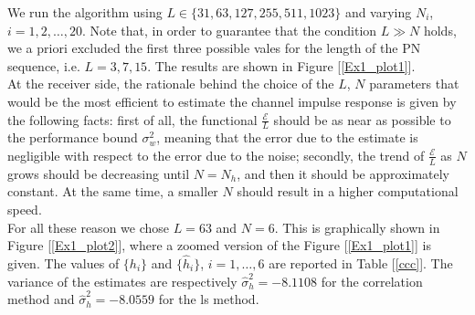 \documentclass[a4paper, 12pt]{report}
\begin{document}
We run the algorithm using $L\in \{31,63, 127, 255, 511, 1023\}$ and varying $N_i$, $i=1,2,\dots,20$. Note that, in order to guarantee that the condition $L\gg N $ holds, we a priori excluded the first three possible vales for the length of the PN sequence, i.e. $L=3,7,15$. The results are shown in Figure [\ref{Ex1_plot1}].\\
At the receiver side, the rationale behind the choice of the $L$, $N$ parameters that would be the most efficient to estimate the channel impulse response is given by the following facts: first of all, the functional $\frac{\mathcal{E}}{L}$ should be as near as possible to the performance bound $\sigma_w^2$, meaning that the error due to the estimate is negligible with respect to the error due to the noise; secondly, the trend of $\frac{\mathcal{E}}{L}$ as $N$ grows should be decreasing until $N = N_h$, and then it should be approximately constant. At the same time, a smaller $N$ should result in a higher computational speed. \\
For all these reason we chose $L=63$ and $N=6$. This is graphically shown in Figure [\ref{Ex1_plot2}], where a zoomed version of the Figure [\ref{Ex1_plot1}] is given.
The values of $\{h_i\}$ and $\{\hat{h}_i\}$, $i=1,\dots,6$ are reported in Table [\ref{ccc}]. The variance of the estimates are respectively $\hat{\sigma}_h^2 = -8.1108$ for the correlation method and $\hat{\sigma}_h^2 = -8.0559$ for the ls method.


\end{document}
